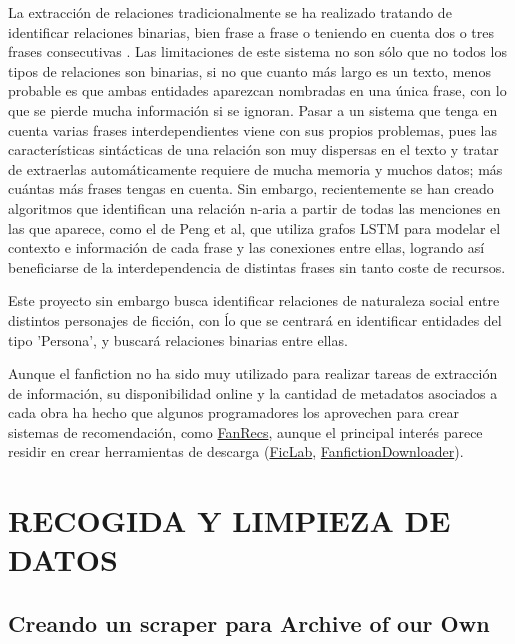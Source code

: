 \documentclass{pre-tfg}
\begin{document}
La extracción de relaciones tradicionalmente se ha realizado tratando de identificar relaciones binarias, bien frase a frase o teniendo en cuenta dos o tres frases consecutivas\cite{zelenko_2003} \cite{craven_99}. Las limitaciones de este sistema no son sólo que no todos los tipos de relaciones son binarias, si no que cuanto más largo es un texto, menos probable es que ambas entidades aparezcan nombradas en una única frase, con lo que se pierde mucha información si se ignoran. Pasar a un sistema que tenga en cuenta varias frases interdependientes viene con sus propios problemas, pues las características sintácticas de una relación son muy dispersas en el texto y tratar de extraerlas automáticamente requiere de mucha memoria y muchos datos; más cuántas más frases tengas en cuenta. Sin embargo, recientemente se han creado algoritmos que identifican una relación n-aria a partir de todas las menciones en las que aparece, como el de Peng et al\cite{peng_17}, que utiliza grafos LSTM para modelar el contexto e información de cada frase y las conexiones entre ellas, logrando así beneficiarse de la interdependencia de distintas frases sin tanto coste de recursos.

Este proyecto sin embargo busca identificar relaciones de naturaleza social entre distintos personajes de ficción, con ĺo que se centrará en identificar entidades del tipo 'Persona', y buscará relaciones binarias entre ellas. 

Aunque el fanfiction no ha sido muy utilizado para realizar tareas de extracción de información, su disponibilidad online y la cantidad de metadatos asociados a cada obra ha hecho que algunos programadores los aprovechen para crear sistemas de recomendación, como \href{http://www.fanrecs.com/}{FanRecs}, aunque el principal interés parece residir en crear herramientas de descarga  (\href{https://www.ficlab.com/}{FicLab}, \href{https://www.fanfictiondownloader.net/#/home}{FanfictionDownloader}).



\cleardoublepage
\section{RECOGIDA Y LIMPIEZA DE DATOS}

\subsection{Creando un scraper para Archive of our Own}
\label{sec:recogidadatos}
\end{document}
